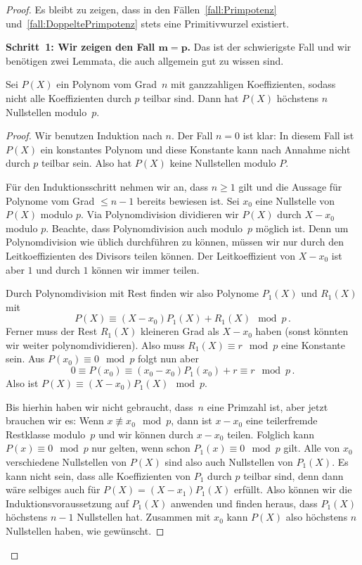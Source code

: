 \begin{proof}
	Es bleibt zu zeigen, dass in den Fällen~\ref{fall:Primpotenz} und~\ref{fall:DoppeltePrimpotenz} stets eine Primitivwurzel existiert.
	
	\textbf{Schritt~1: Wir zeigen den Fall $\boldsymbol{m=p}$.} Das ist der schwierigste Fall und wir benötigen zwei Lemmata, die auch allgemein gut zu wissen sind.
	\begin{satzmitnamen}[Lemma~1]
		Sei $P(X)$ ein Polynom vom Grad~$n$ mit ganzzahligen Koeffizienten, sodass nicht alle Koeffizienten durch $p$ teilbar sind. Dann hat $P(X)$ höchstens $n$ Nullstellen modulo~$p$.
	\end{satzmitnamen}
	\begin{proof}
		Wir benutzen Induktion nach $n$. Der Fall $n=0$ ist klar: In diesem Fall ist $P(X)$ ein konstantes Polynom und diese Konstante kann nach Annahme nicht durch $p$ teilbar sein. Also hat $P(X)$ keine Nullstellen modulo $P$.
		
		Für den Induktionsschritt nehmen wir an, dass $n\geqslant 1$ gilt und die Aussage für Polynome vom Grad $\leqslant n-1$ bereits bewiesen ist. Sei $x_0$ eine Nullstelle von $P(X)$ modulo $p$. Via Polynomdivision dividieren wir $P(X)$ durch $X-x_0$ modulo $p$. Beachte, dass Polynomdivision auch modulo~$p$ möglich ist. Denn um Polynomdivision wie üblich durchführen zu können, müssen wir nur durch den Leitkoeffizienten des Divisors teilen können. Der Leitkoeffizient von $X-x_0$ ist aber $1$ und durch $1$ können wir immer teilen.
		
		Durch Polynomdivision mit Rest finden wir also Polynome $P_1(X)$ und $R_1(X)$ mit
		\begin{equation*}
			P(X)\equiv (X-x_0)P_1(X)+R_1(X)\mod p\,.
		\end{equation*}
		Ferner muss der Rest $R_1(X)$ kleineren Grad als $X-x_0$ haben (sonst könnten wir weiter polynomdividieren). Also muss $R_1(X)\equiv r\mod p$ eine Konstante sein. Aus $P(x_0)\equiv 0\mod p$ folgt nun aber
		\begin{equation*}
			0\equiv P(x_0)\equiv (x_0-x_0)P_1(x_0)+r\equiv r\mod p\,.
		\end{equation*}
		Also ist $P(X)\equiv (X-x_0)P_1(X)\mod p$.
		
		Bis hierhin haben wir nicht gebraucht, dass~$n$ eine Primzahl ist, aber jetzt brauchen wir es: Wenn $x\not\equiv x_0\mod p$, dann ist $x-x_0$ eine teilerfremde Restklasse modulo~$p$ und wir können durch $x-x_0$ teilen. Folglich kann $P(x)\equiv 0\mod p$ nur gelten, wenn schon $P_1(x)\equiv 0\mod p$ gilt. Alle von $x_0$ verschiedene Nullstellen von $P(X)$ sind also auch Nullstellen von $P_1(X)$. Es kann nicht sein, dass alle Koeffizienten von $P_1$ durch $p$ teilbar sind, denn dann wäre selbiges auch für $P(X)=(X-x_1)P_1(X)$ erfüllt. Also können wir die Induktionsvoraussetzung auf $P_1(X)$ anwenden und finden heraus, dass $P_1(X)$ höchstens $n-1$ Nullstellen hat. Zusammen mit $x_0$ kann $P(X)$ also höchstens $n$ Nullstellen haben, wie gewünscht.
	\end{proof}	
	

\end{proof}
